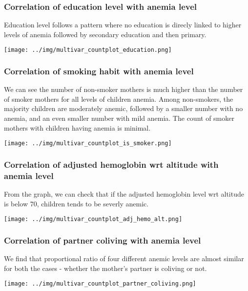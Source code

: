 \subsubsection{Correlation of education level with anemia level}

Education level follows a pattern where no education is direcly linked to higher levels of anemia followed by secondary education and then primary.

\texttt{[image: ../img/multivar\_countplot\_education.png]}

\subsubsection{Correlation of smoking habit with anemia level}

We can see the number of non-smoker mothers is much higher than the number of smoker mothers for all levels of children anemia. Among non-smokers, the majority children are moderately anemic, followed by a smaller number with no anemia, and an even smaller number with mild anemia. The count of smoker mothers with children having anemia is minimal.

\texttt{[image: ../img/multivar\_countplot\_is\_smoker.png]}

\subsubsection{Correlation of adjusted hemoglobin wrt altitude with anemia level}

From the graph, we can check that if the adjusted hemoglobin level wrt altitude is below 70, children tends to be severly anemic.

\texttt{[image: ../img/multivar\_countplot\_adj\_hemo\_alt.png]}



\subsubsection{Correlation of partner coliving with anemia level}


We find that proportional ratio of four different anemic levels are almost similar for both the cases - whether the mother's partner is coliving or not.

\texttt{[image: ../img/multivar\_countplot\_partner\_coliving.png]}

\newpage

